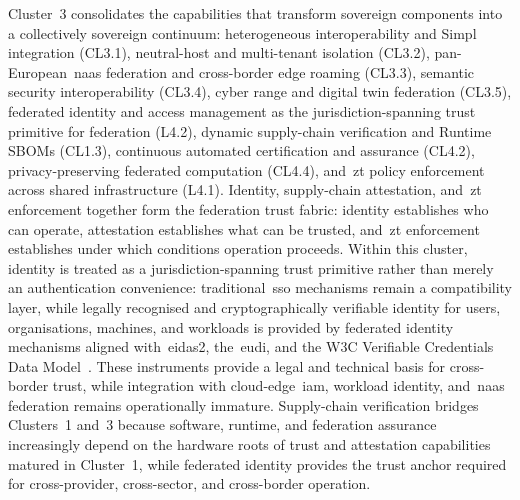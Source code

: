 \documentclass{ieeeaccess}
\begin{document}
Cluster~3 consolidates the capabilities that transform sovereign components into a collectively sovereign continuum: heterogeneous interoperability and Simpl integration (CL3.1), neutral-host and multi-tenant isolation (CL3.2), pan-European~\gls{naas} federation and cross-border edge roaming (CL3.3), semantic security interoperability (CL3.4), cyber range and digital twin federation (CL3.5), federated identity and access management as the jurisdiction-spanning trust primitive for federation (L4.2), dynamic supply-chain verification and Runtime SBOMs (CL1.3), continuous automated certification and assurance (CL4.2), privacy-preserving federated computation (CL4.4), and~\gls{zt} policy enforcement across shared infrastructure (L4.1). Identity, supply-chain attestation, and~\gls{zt} enforcement together form the federation trust fabric: identity establishes who can operate, attestation establishes what can be trusted, and~\gls{zt} enforcement establishes under which conditions operation proceeds. Within this cluster, identity is treated as a jurisdiction-spanning trust primitive rather than merely an authentication convenience: traditional~\gls{sso} mechanisms remain a compatibility layer, while legally recognised and cryptographically verifiable identity for users, organisations, machines, and workloads is provided by federated identity mechanisms aligned with~\gls{eidas2}, the~\gls{eudi}, and the W3C Verifiable Credentials Data Model~\cite{eueidas2,eudiwallet2026,w3cvc2025}. These instruments provide a legal and technical basis for cross-border trust, while integration with cloud-edge~\gls{iam}, workload identity, and~\gls{naas} federation remains operationally immature. Supply-chain verification bridges Clusters~1 and~3 because software, runtime, and federation assurance increasingly depend on the hardware roots of trust and attestation capabilities matured in Cluster~1, while federated identity provides the trust anchor required for cross-provider, cross-sector, and cross-border operation.
\end{document}
